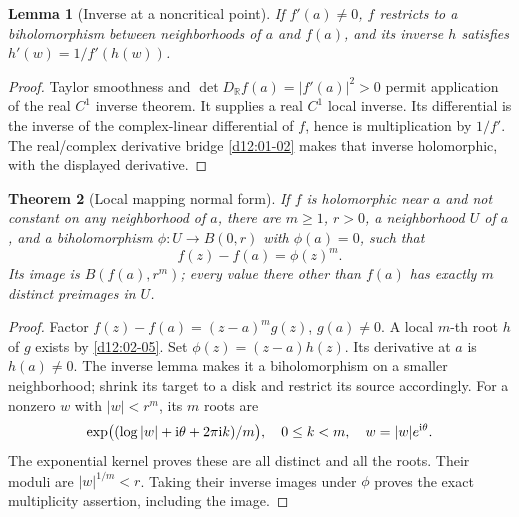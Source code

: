 \documentclass[11pt,a4paper,openany]{book}
\newtheorem{theorem}{Theorem}[chapter]
\newtheorem{lemma}[theorem]{Lemma}
\theoremstyle{definition}
\theoremstyle{remark}\newtheorem{remark}[theorem]{Remark}
\newcommand{\R}{\mathbb R}\newcommand{\C}{\mathbb C}
\newcommand{\family}[1]{}
\begin{document}
\begin{lemma}[Inverse at a noncritical point]\label{d12:05:inverse-noncritical}
If \(f'(a)\ne0\), \(f\) restricts to a biholomorphism between
neighborhoods of \(a\) and \(f(a)\), and its inverse \(h\) satisfies
\(h'(w)=1/f'(h(w))\).
\end{lemma}
\begin{proof}
Taylor smoothness and \(\det D_{\R}f(a)=|f'(a)|^2>0\) permit application
of the real \(C^1\) inverse theorem. It supplies a real \(C^1\)
local inverse. Its differential is the inverse of the complex-linear
differential of \(f\), hence is multiplication by \(1/f'\).
The real/complex derivative bridge \cref{d12:01-02} makes that inverse
holomorphic, with the displayed derivative.
\end{proof}

\begin{theorem}[Local mapping normal form]\family{D12.05.05}\label{d12:05-05}
If \(f\) is holomorphic near \(a\) and not constant on any neighborhood
of \(a\), there are \(m\ge1\), \(r>0\), a neighborhood \(U\) of \(a\),
and a biholomorphism \(\phi:U\to B(0,r)\) with \(\phi(a)=0\), such that
\[
 f(z)-f(a)=\phi(z)^m .
\]
Its image is \(B(f(a),r^m)\); every value there other than \(f(a)\)
has exactly \(m\) distinct preimages in \(U\).
\end{theorem}
\begin{proof}
Factor \(f(z)-f(a)=(z-a)^m g(z)\), \(g(a)\ne0\).
A local \(m\)-th root \(h\) of \(g\) exists by
\cref{d12:02-05}. Set \(\phi(z)=(z-a)h(z)\).
Its derivative at \(a\) is \(h(a)\ne0\).
The inverse lemma makes it a biholomorphism on a smaller neighborhood;
shrink its target to a disk and restrict its source accordingly.
For a nonzero \(w\) with \(|w|<r^m\), its \(m\) roots are
\[
 \exp\bigl((\log|w|+\mathrm i\theta+2\pi\mathrm i k)/m\bigr),
 \quad 0\le k<m,\quad w=|w|e^{\mathrm i\theta}.
\]
The exponential kernel proves these are all distinct and all the roots.
Their moduli are \(|w|^{1/m}<r\). Taking their inverse images under
\(\phi\) proves the exact multiplicity assertion, including the image.
\end{proof}
\end{document}
